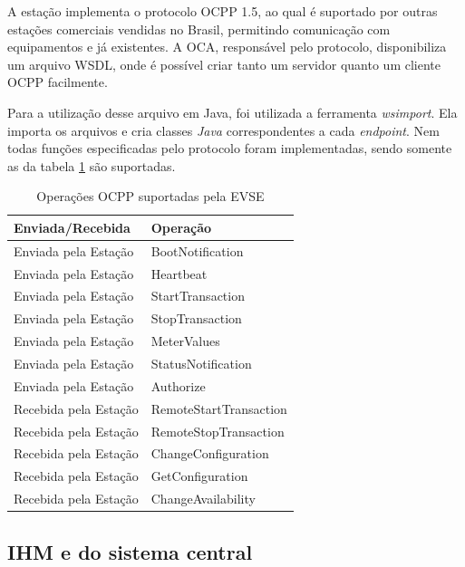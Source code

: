 A estação implementa o protocolo \ac{OCPP} 1.5, ao qual é suportado por outras estações comerciais vendidas no Brasil, permitindo comunicação com equipamentos e  já existentes. A \ac{OCA}, responsável pelo protocolo, disponibiliza um arquivo WSDL, onde é possível criar tanto um servidor quanto um cliente OCPP facilmente.

Para a utilização desse arquivo em Java, foi utilizada a ferramenta \textit{wsimport}. Ela importa os arquivos e cria classes \textit{Java} correspondentes a cada \textit{endpoint}. Nem todas funções especificadas pelo protocolo foram implementadas, sendo somente as da tabela \ref{table:ocpp} são suportadas.

\begin{table}[]
  \centering
  \caption{Operações OCPP suportadas pela EVSE}
  \label{table:ocpp}
  \begin{tabular}{@{}ll@{}}
    \toprule
    \textbf{Enviada/Recebida} & \textbf{Operação}      \\ \midrule
      Enviada pela Estação      & BootNotification       \\
      Enviada pela Estação      & Heartbeat              \\
      Enviada pela Estação      & StartTransaction       \\
      Enviada pela Estação      & StopTransaction        \\
      Enviada pela Estação      & MeterValues            \\
      Enviada pela Estação      & StatusNotification     \\
      Enviada pela Estação      & Authorize              \\
      Recebida pela Estação     & RemoteStartTransaction \\
      Recebida pela Estação     & RemoteStopTransaction  \\
      Recebida pela Estação     & ChangeConfiguration    \\
      Recebida pela Estação     & GetConfiguration       \\
      Recebida pela Estação     & ChangeAvailability     \\ \bottomrule
    \end{tabular}
\end{table}

\subsection{IHM e do sistema central}

